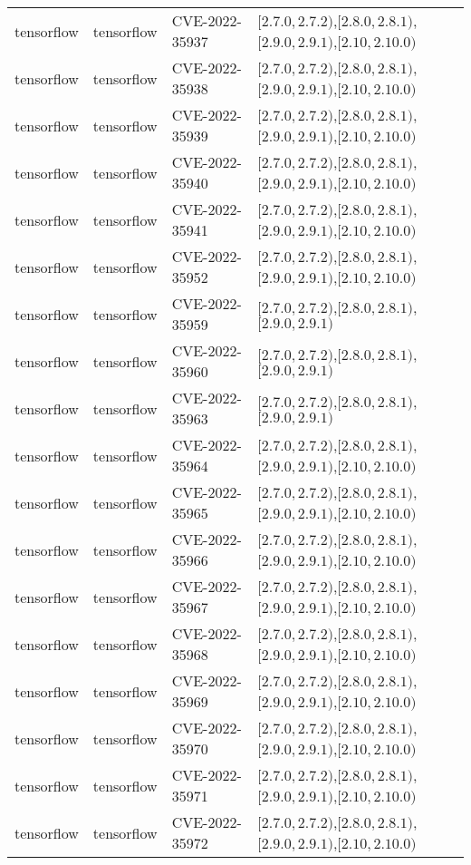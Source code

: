 \begin{tabular}{llll}
tensorflow & tensorflow & CVE-2022-35937 & $[2.7.0,2.7.2)$,$[2.8.0,2.8.1)$,$[2.9.0,2.9.1)$,$[2.10,2.10.0)$ \\
tensorflow & tensorflow & CVE-2022-35938 & $[2.7.0,2.7.2)$,$[2.8.0,2.8.1)$,$[2.9.0,2.9.1)$,$[2.10,2.10.0)$ \\
tensorflow & tensorflow & CVE-2022-35939 & $[2.7.0,2.7.2)$,$[2.8.0,2.8.1)$,$[2.9.0,2.9.1)$,$[2.10,2.10.0)$ \\
tensorflow & tensorflow & CVE-2022-35940 & $[2.7.0,2.7.2)$,$[2.8.0,2.8.1)$,$[2.9.0,2.9.1)$,$[2.10,2.10.0)$ \\
tensorflow & tensorflow & CVE-2022-35941 & $[2.7.0,2.7.2)$,$[2.8.0,2.8.1)$,$[2.9.0,2.9.1)$,$[2.10,2.10.0)$ \\
tensorflow & tensorflow & CVE-2022-35952 & $[2.7.0,2.7.2)$,$[2.8.0,2.8.1)$,$[2.9.0,2.9.1)$,$[2.10,2.10.0)$ \\
tensorflow & tensorflow & CVE-2022-35959 & $[2.7.0,2.7.2)$,$[2.8.0,2.8.1)$,$[2.9.0,2.9.1)$ \\
tensorflow & tensorflow & CVE-2022-35960 & $[2.7.0,2.7.2)$,$[2.8.0,2.8.1)$,$[2.9.0,2.9.1)$ \\
tensorflow & tensorflow & CVE-2022-35963 & $[2.7.0,2.7.2)$,$[2.8.0,2.8.1)$,$[2.9.0,2.9.1)$ \\
tensorflow & tensorflow & CVE-2022-35964 & $[2.7.0,2.7.2)$,$[2.8.0,2.8.1)$,$[2.9.0,2.9.1)$,$[2.10,2.10.0)$ \\
tensorflow & tensorflow & CVE-2022-35965 & $[2.7.0,2.7.2)$,$[2.8.0,2.8.1)$,$[2.9.0,2.9.1)$,$[2.10,2.10.0)$ \\
tensorflow & tensorflow & CVE-2022-35966 & $[2.7.0,2.7.2)$,$[2.8.0,2.8.1)$,$[2.9.0,2.9.1)$,$[2.10,2.10.0)$ \\
tensorflow & tensorflow & CVE-2022-35967 & $[2.7.0,2.7.2)$,$[2.8.0,2.8.1)$,$[2.9.0,2.9.1)$,$[2.10,2.10.0)$ \\
tensorflow & tensorflow & CVE-2022-35968 & $[2.7.0,2.7.2)$,$[2.8.0,2.8.1)$,$[2.9.0,2.9.1)$,$[2.10,2.10.0)$ \\
tensorflow & tensorflow & CVE-2022-35969 & $[2.7.0,2.7.2)$,$[2.8.0,2.8.1)$,$[2.9.0,2.9.1)$,$[2.10,2.10.0)$ \\
tensorflow & tensorflow & CVE-2022-35970 & $[2.7.0,2.7.2)$,$[2.8.0,2.8.1)$,$[2.9.0,2.9.1)$,$[2.10,2.10.0)$ \\
tensorflow & tensorflow & CVE-2022-35971 & $[2.7.0,2.7.2)$,$[2.8.0,2.8.1)$,$[2.9.0,2.9.1)$,$[2.10,2.10.0)$ \\
tensorflow & tensorflow & CVE-2022-35972 & $[2.7.0,2.7.2)$,$[2.8.0,2.8.1)$,$[2.9.0,2.9.1)$,$[2.10,2.10.0)$ \\

\end{tabular}

